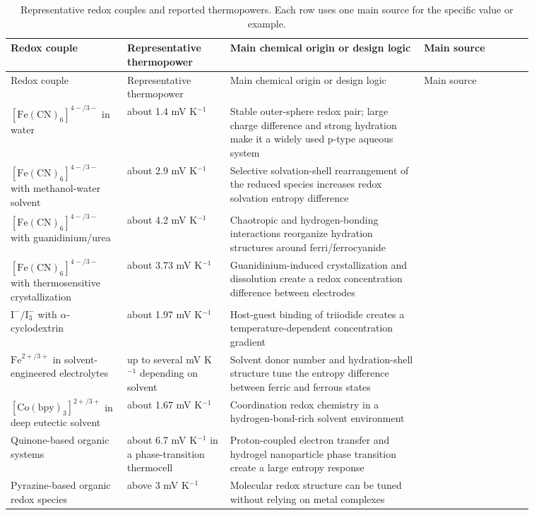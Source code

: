 \begin{longtable}{>{\raggedright\arraybackslash}p{0.19\linewidth}
>{\raggedright\arraybackslash}p{0.17\linewidth}
>{\raggedright\arraybackslash}p{0.32\linewidth}
>{\raggedright\arraybackslash}p{0.18\linewidth}}
\caption{Representative redox couples and reported thermopowers. Each row uses
one main source for the specific value or example.}\\
\toprule
Redox couple & Representative thermopower & Main chemical origin or design
logic & Main source \\
\midrule
\endfirsthead
\toprule
Redox couple & Representative thermopower & Main chemical origin or design
logic & Main source \\
\midrule
\endhead
$[\mathrm{Fe(CN)}_6]^{4-/3-}$ in water & about 1.4 mV K$^{-1}$ & Stable
outer-sphere redox pair; large charge difference and strong hydration make it a
widely used p-type aqueous system & \citep{duan2018aqueous} \\
$[\mathrm{Fe(CN)}_6]^{4-/3-}$ with methanol-water solvent & about 2.9 mV
K$^{-1}$ & Selective solvation-shell rearrangement of the reduced species
increases redox solvation entropy difference & \citep{kim2017high} \\
$[\mathrm{Fe(CN)}_6]^{4-/3-}$ with guanidinium/urea & about 4.2 mV K$^{-1}$
& Chaotropic and hydrogen-bonding interactions reorganize hydration structures
around ferri/ferrocyanide & \citep{duan2018aqueous} \\
$[\mathrm{Fe(CN)}_6]^{4-/3-}$ with thermosensitive crystallization & about
3.73 mV K$^{-1}$ & Guanidinium-induced crystallization and dissolution create
a redox concentration difference between electrodes & \citep{yu2020thermosensitive} \\
$\mathrm{I}^{-}/\mathrm{I}_3^{-}$ with $\alpha$-cyclodextrin & about 1.97
mV K$^{-1}$ & Host-guest binding of triiodide creates a temperature-dependent
concentration gradient & \citep{zhou2016supramolecular} \\
$\mathrm{Fe}^{2+/3+}$ in solvent-engineered electrolytes & up to several mV
K$^{-1}$ depending on solvent & Solvent donor number and hydration-shell
structure tune the entropy difference between ferric and ferrous states &
\citep{chen2023solvation} \\
$[\mathrm{Co(bpy)}_3]^{2+/3+}$ in deep eutectic solvent & about 1.67 mV
K$^{-1}$ & Coordination redox chemistry in a hydrogen-bond-rich solvent
environment & \citep{antariksa2021deep} \\
Quinone-based organic systems & about 6.7 mV K$^{-1}$ in a phase-transition
thermocell & Proton-coupled electron transfer and hydrogel nanoparticle phase
transition create a large entropy response &
\citep{guo2020nanoparticle} \\
Pyrazine-based organic redox species & above 3 mV K$^{-1}$ & Molecular redox
structure can be tuned without relying on metal complexes & \citep{lee2025pyrazine} \\
\bottomrule
\end{longtable}

